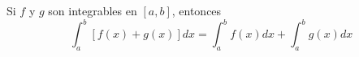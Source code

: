 \item Si $f$ y $g$ son integrables en $[a, b]$, entonces
$$\int_a^b [f(x) + g(x)] dx = \int_a^b f(x) dx + \int_a^b g(x) dx$$
